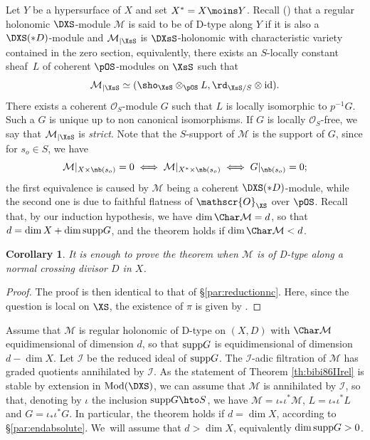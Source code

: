 \documentclass{amsart}
\theoremstyle{plain}
\numberwithin{theorem}{section}
\newtheorem{coro}[theorem]{Corollary}
\theoremstyle{definition}
\theoremstyle{remark}
\theoremstyle{definition}
\newcommand{\cI}{\mathcal{I}}
\newcommand{\cM}{\mathcal{M}}
\newcommand{\cO}{\mathscr{O}}
\newcommand{\Mod}{\textup{Mod}}
\newcommand{\id}{\textup{id}}
\newcommand{\supp}{\textup{supp}}
\begin{document}
Let $Y$ be a hypersurface of $X$ and set $X^*=X\moins Y$. Recall (\cf \cite[Def.\,4.23]{FFS23}) that a regular holonomic $\DXS$-module $\cM$ is said to be of D-type along $Y$ if it is also a $\DXS(*D)$-module and $\cM_{|\XsS}$ is $\DXsS$-holonomic with characteristic variety contained in the zero section, equivalently, there exists an $S$-locally constant sheaf~$L$ of coherent $\pOS$-modules on $\XsS$ such that
\[
\cM_{|\XsS}\simeq (\sho_{\XsS}\otimes_{\pOS}L,\rd_{\XsS/S}\otimes\id).
\]
There exists a coherent $\cO_S$\nobreakdash-module $G$ such that $L$ is locally isomorphic to $p^{-1}G$. Such a $G$ is unique up to non canonical isomorphisms. If $G$ is locally $\cO_S$-free, we say that $\cM_{|\XsS}$ is \emph{strict}. Note that the $S$-support of $\cM$ is the support of $G$, since for $s_o\in S$, we have
\[
\cM|_{X\times\nb(s_o)}=0\iff\cM|_{X^*\times\nb(s_o)}\iff G|_{\nb(s_o)}=0;
\]
the first equivalence is caused by $\cM$ being a coherent $\DXS(*D)$-module, while the second one is due to faithful flatness of $\cO_{\XS}$ over $\pOS$. Recall that, by our induction hypothesis, we have $\dim\Char\cM=d$, so that $d=\dim X+\dim\supp G$, and the theorem holds if $\dim\Char\cM<d$.

\begin{coro}
It is enough to prove the theorem when $\cM$ is of D-type along a normal crossing divisor $D$ in $X$.
\end{coro}

\begin{proof}
The proof is then identical to that of \S\ref{par:reductionnc}. Here, since the question is local on $\XS$, the existence of $\pi$ is given by \cite[Prop.\,4.27]{FFS23}.
\end{proof}


Assume that $\cM$ is regular holonomic of D-type on $(X,D)$ with $\Char\cM$ equidimensional of dimension $d$, so that $\supp G$ is equidimensional of dimension $d-\dim X$. Let $\cI$ be the reduced ideal of $\supp G$. The $\cI$-adic filtration of $\cM$ has graded quotients annihilated by $\cI$. As the statement of Theorem \ref{th:bibi86IIrel} is stable by extension in $\Mod(\DXS)$, we can assume that $\cM$ is annihilated by $\cI$, so that, denoting by $\iota$ the inclusion $\supp G\hto S$, we have $\cM=\iota_*\iota^*\cM$, $L=\iota_*\iota^*L$ and $G=\iota_*\iota^*G$. In particular, the theorem holds if $d=\dim X$, according to \S\ref{par:endabsolute}. We~will assume that $d>\dim X$, equivalently $\dim\supp G>0$.
\end{document}
